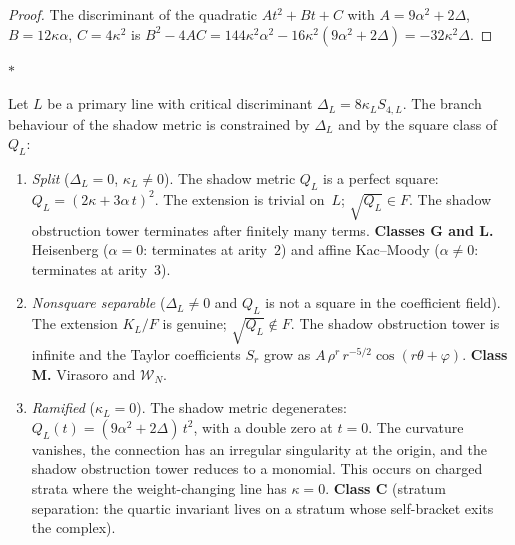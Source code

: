\documentclass[11pt]{article}
\newcommand{\cW}{\mathcal{W}}
\newcommand{\sep}{\bigskip\begin{center}$*$\end{center}\medskip}
\begin{document}
\begin{proof}
The discriminant of the quadratic $At^2 + Bt + C$
with $A = 9\alpha^2 + 2\Delta$, $B = 12\kappa\alpha$,
$C = 4\kappa^2$ is $B^2 - 4AC
= 144\kappa^2\alpha^2 - 16\kappa^2(9\alpha^2 + 2\Delta)
= -32\kappa^2\Delta$.
\end{proof}

\sep

\begin{proposition}
\label{prop:shadow-splitting}
Let $L$ be a primary line with critical discriminant
$\Delta_L = 8\kappa_L S_{4,L}$.  The branch behaviour of the
shadow metric is constrained by $\Delta_L$ and by the square
class of $Q_L$:
\begin{enumerate}[label=\textup{(\roman*)}]
\item \emph{Split} ($\Delta_L = 0$, $\kappa_L \neq 0$).
  The shadow metric $Q_L$ is a perfect square:
  $Q_L = (2\kappa + 3\alpha\,t)^2$.  The extension is trivial
  on~$L$; $\sqrt{Q_L} \in F$.  The shadow obstruction tower terminates
  after finitely many terms.
  \textbf{Classes G and L.}  Heisenberg
  ($\alpha = 0$: terminates at arity~$2$) and affine Kac--Moody
  ($\alpha \neq 0$: terminates at arity~$3$).

\item \emph{Nonsquare separable} ($\Delta_L \neq 0$ and $Q_L$
  is not a square in the coefficient field).
  The extension $K_L/F$ is genuine; $\sqrt{Q_L} \notin F$.
  The shadow obstruction tower is infinite and the Taylor coefficients
  $S_r$ grow as $A\,\rho^r\,r^{-5/2}\cos(r\theta + \varphi)$.
  \textbf{Class M.}  Virasoro and $\cW_N$.

\item \emph{Ramified} ($\kappa_L = 0$).
  The shadow metric degenerates: $Q_L(t) = (9\alpha^2 + 2\Delta)\,t^2$,
  with a double zero at $t = 0$.  The curvature
  vanishes, the connection has an irregular singularity at the
  origin, and the shadow obstruction tower reduces to a monomial.
  This occurs on charged strata where the weight-changing
  line has $\kappa = 0$.  \textbf{Class C}
  (stratum separation: the quartic invariant lives on a
  stratum whose self-bracket exits the complex).
\end{enumerate}
\end{proposition}
\end{document}
